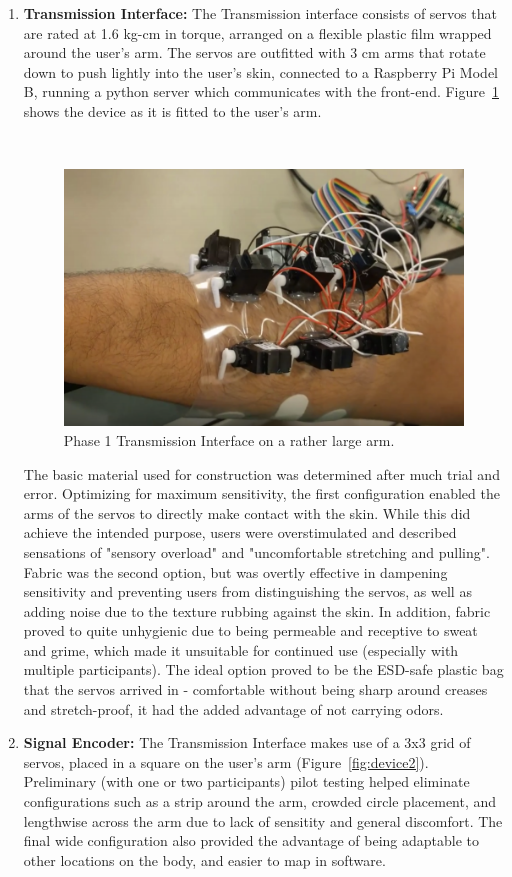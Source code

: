 \documentclass[
12pt, %
oneside, %
english, %
doublespacing, %
headsepline, %
]{MastersDoctoralThesis} %
\begin{document}
\begin{enumerate}
\item \textbf{Transmission Interface:} The Transmission interface consists of servos that are rated at 1.6 kg-cm in torque, arranged on a flexible plastic film wrapped around the user's arm. The servos are outfitted with 3 cm arms that rotate down to push lightly into the user's skin, connected to a Raspberry Pi Model B, running a python server which communicates with the front-end. Figure~\ref{fig:device1} shows the device as it is fitted to the user's arm.

\,

\begin{figure}[ht]
\centering\includegraphics[width=0.7\linewidth]{images/v1device.png}
\caption[P1 Device]{Phase 1 Transmission Interface on a rather large arm.}
\decoRule
\label{fig:device1}
\end{figure}

The basic material used for construction was determined after much trial and error. Optimizing for maximum sensitivity, the first configuration enabled the arms of the servos to directly make contact with the skin. While this did achieve the intended purpose, users were overstimulated and described sensations of "sensory overload" and "uncomfortable stretching and pulling". Fabric was the second option, but was overtly effective in dampening sensitivity and preventing users from distinguishing the servos, as well as adding noise due to the texture rubbing against the skin. In addition, fabric proved to quite unhygienic due to being permeable and receptive to sweat and grime, which made it unsuitable for continued use (especially with multiple participants). The ideal option proved to be the ESD-safe plastic bag that the servos arrived in - comfortable without being sharp around creases and stretch-proof, it had the added advantage of not carrying odors.

\item \textbf{Signal Encoder:} The Transmission Interface makes use of a 3x3 grid of servos, placed in a square on the user's arm (Figure~\ref{fig:device2}). Preliminary (with one or two participants) pilot testing helped eliminate configurations such as a strip around the arm, crowded circle placement, and lengthwise across the arm due to lack of sensitity and general discomfort. The final wide configuration also provided the advantage of being adaptable to other locations on the body, and easier to map in software.


\end{enumerate}
\end{document}

